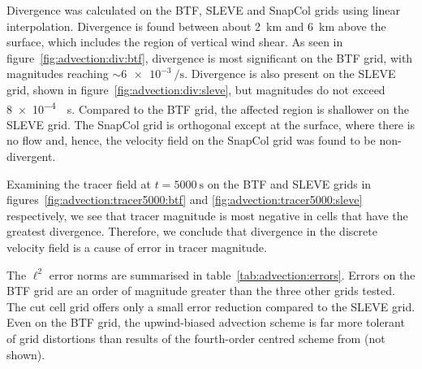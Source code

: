 Divergence was calculated on the BTF, SLEVE and SnapCol grids using linear interpolation.  Divergence is found between about \SI{2}{\kilo\meter} and \SI{6}{\kilo\meter} above the surface, which includes the region of vertical wind shear.  As seen in figure~\ref{fig:advection:div:btf}, divergence is most significant on the BTF grid, with magnitudes reaching $\sim \SI{6e-3}{\per\second}$.  Divergence is also present on the SLEVE grid, shown in figure~\ref{fig:advection:div:sleve}, but magnitudes do not exceed \SI{8e-4}{\per\second}.
Compared to the BTF grid, the affected region is shallower on the SLEVE grid.
The SnapCol grid is orthogonal except at the surface, where there is no flow and, hence, the velocity field on the SnapCol grid was found to be non-divergent.

Examining the tracer field at $t = \SI{5000}{\second}$ on the BTF and SLEVE grids in figures~\ref{fig:advection:tracer5000:btf} and \ref{fig:advection:tracer5000:sleve} respectively, we see that tracer magnitude is most negative in cells that have the greatest divergence.  Therefore, we conclude that divergence in the discrete velocity field is a cause of error in tracer magnitude.

The $\ell^2$ error norms are summarised in table~\ref{tab:advection:errors}.  Errors on the BTF grid are an order of magnitude greater than the three other grids tested.  The cut cell grid offers only a small error reduction compared to the SLEVE grid.  Even on the BTF grid, the upwind-biased advection scheme is far more tolerant of grid distortions than results of the fourth-order centred scheme from \textcite{schaer2002} (not shown).


